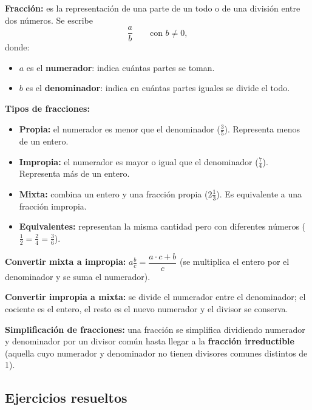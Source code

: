 \documentclass[12pt, letterpaper]{article}
\begin{document}
\begin{cuadroteoria}
  \textbf{Fracción:} es la representación de una parte de un todo o de una división entre dos números. Se escribe
  $$\frac{a}{b} \qquad \text{con } b \neq 0,$$
  donde:
  \begin{itemize}[leftmargin=*]
    \item $a$ es el \textbf{numerador}: indica cuántas partes se toman.
    \item $b$ es el \textbf{denominador}: indica en cuántas partes iguales se divide el todo.
  \end{itemize}

  \textbf{Tipos de fracciones:}
  \begin{itemize}[leftmargin=*]
    \item \textbf{Propia:} el numerador es menor que el denominador ($\frac{3}{5}$). Representa menos de un entero.
    \item \textbf{Impropia:} el numerador es mayor o igual que el denominador ($\frac{7}{4}$). Representa más de un entero.
    \item \textbf{Mixta:} combina un entero y una fracción propia ($2\frac{1}{3}$). Es equivalente a una fracción impropia.
    \item \textbf{Equivalentes:} representan la misma cantidad pero con diferentes números ($\frac{1}{2} = \frac{2}{4} = \frac{3}{6}$).
  \end{itemize}
\end{cuadroteoria}

\begin{cuadropasos}
  \textbf{Convertir mixta a impropia:} $a\frac{b}{c} = \dfrac{a \cdot c + b}{c}$ \quad (se multiplica el entero por el denominador y se suma el numerador).

  \textbf{Convertir impropia a mixta:} se divide el numerador entre el denominador; el cociente es el entero, el resto es el nuevo numerador y el divisor se conserva.
\end{cuadropasos}

\begin{cuadroteoria}
  \textbf{Simplificación de fracciones:} una fracción se simplifica dividiendo numerador y denominador por un divisor común hasta llegar a la \textbf{fracción irreductible} (aquella cuyo numerador y denominador no tienen divisores comunes distintos de 1).
\end{cuadroteoria}

\subsection{Ejercicios resueltos}
\end{document}
